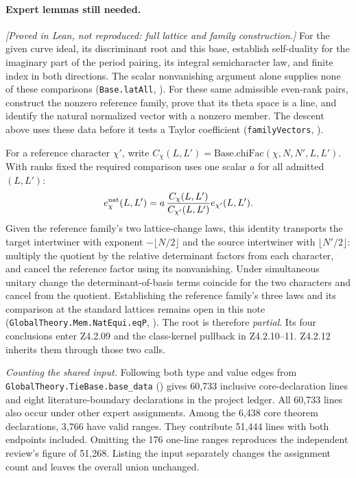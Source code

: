 \paragraph{Expert lemmas still needed.}
\emph{[Proved in Lean, not reproduced: full lattice and family construction.]}
For the given curve ideal, its discriminant root and this base, establish self-duality for the imaginary part of the period pairing, its integral semicharacter law, and finite index in both directions. The scalar nonvanishing argument alone supplies none of these comparisons (\nolinkurl{Base.latAll}, ). For these same admissible even-rank pairs, construct the nonzero reference family, prove that its theta space is a line, and identify the natural normalized vector with a nonzero member. The descent above uses these data before it tests a Taylor coefficient (\nolinkurl{familyVectors}, ).

For a reference character \(\chi'\), write \(C_\chi(L,L')=\mathrm{Base.chiFac}(\chi,N,N',L,L')\).
With ranks fixed the required comparison uses one scalar \(a\) for all admitted \((L,L')\):
\[
 e^{\rm nat}_\chi(L,L')=a\,\frac{C_\chi(L,L')}{C_{\chi'}(L,L')}e_{\chi'}(L,L').
\]
Given the reference family's two lattice-change laws, this identity transports the target intertwiner with exponent \(-\lfloor N/2\rfloor\) and the source intertwiner with \(\lfloor N'/2\rfloor\): multiply the quotient by the relative determinant factors from each character, and cancel the reference factor using its nonvanishing. Under simultaneous unitary change the determinant-of-basis terms coincide for the two characters and cancel from the quotient. Establishing the reference family's three laws and its comparison at the standard lattices remains open in this note (\nolinkurl{GlobalTheory.Mem.NatEqui.eqP}, ). The root is therefore \emph{partial}. Its four conclusions enter Z4.2.09 and the class-kernel pullback in Z4.2.10--11. Z4.2.12 inherits them through those two calls.

\emph{Counting the shared input.} Following both type and value edges from \nolinkurl{GlobalTheory.TieBase.base_data} () gives 60,733 inclusive core-declaration lines and eight literature-boundary declarations in the project ledger. All 60,733 lines also occur under other expert assignments. Among the 6,438 core theorem declarations, 3,766 have valid ranges. They contribute 51,444 lines with both endpoints included. Omitting the 176 one-line ranges reproduces the independent review's figure of 51,268. Listing the input separately changes the assignment count and leaves the overall union unchanged.

